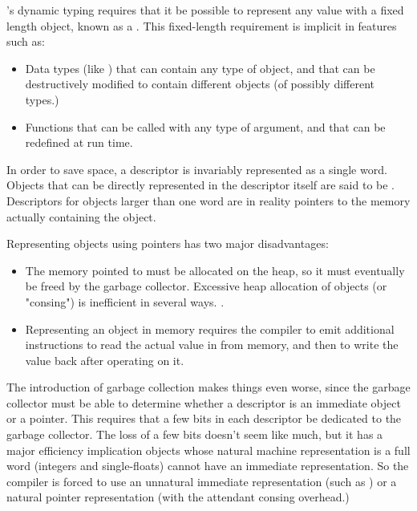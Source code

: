 {\llisp{}'s dynamic typing requires that it be possible to represent any value
with a fixed length object, known as a .  This fixed-length
requirement is implicit in features such as:
\begin{itemize}

\item
Data types (like ) that can contain any type of object, and
that can be destructively modified to contain different objects (of possibly
different types.)

\item
Functions that can be called with any type of argument, and that can be
redefined at run time.
\end{itemize}

In order to save space, a descriptor is invariably represented as a single
word.  Objects that can be directly represented in the descriptor itself are
said to be .  Descriptors for objects larger than one word are in
reality pointers to the memory actually containing the object.

Representing objects using pointers has two major disadvantages:
\begin{itemize}

\item
The memory pointed to must be allocated on the heap, so it must eventually be
freed by the garbage collector.  Excessive heap allocation of objects (or
"consing") is inefficient in several ways.  .

\item
Representing an object in memory requires the compiler to emit additional
instructions to read the actual value in from memory, and then to write the
value back after operating on it.
\end{itemize}

The introduction of garbage collection makes things even worse, since the
garbage collector must be able to determine whether a descriptor is an
immediate object or a pointer.  This requires that a few bits in each
descriptor be dedicated to the garbage collector.  The loss of a few bits
doesn't seem like much, but it has a major efficiency implication \dash{} objects
whose natural machine representation is a full word (integers and
single-floats) cannot have an immediate representation.  So the compiler is
forced to use an unnatural immediate representation (such as ) or a
natural pointer representation (with the attendant consing overhead.)


}
